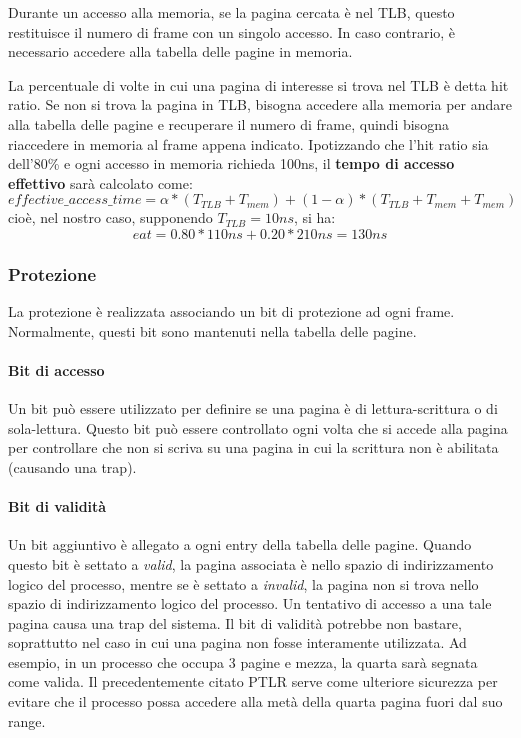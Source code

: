 \documentclass[a4paper]{article}
\begin{document}
Durante un accesso alla memoria, se la pagina cercata è nel TLB, questo restituisce il numero di frame con un singolo accesso. In caso contrario, è necessario accedere alla tabella delle pagine in memoria.

La percentuale di volte in cui una pagina di interesse si trova nel TLB è detta hit ratio. Se non si trova la pagina in TLB, bisogna accedere alla memoria per andare alla tabella delle pagine e recuperare il numero di frame, quindi bisogna riaccedere in memoria al frame appena indicato. Ipotizzando che l'hit ratio sia dell'80\% e ogni accesso in memoria richieda 100ns, il \textbf{tempo di accesso effettivo} sarà calcolato come:
$$ effective\_access\_time = \alpha * (T_{TLB}+T_{mem}) + (1-\alpha) * (T_{TLB}+T_{mem} + T_{mem}) $$
cioè, nel nostro caso, supponendo $T_{TLB} = 10ns$, si ha:
$$ eat = 0.80 * 110ns + 0.20 * 210ns = 130ns $$

\subsubsection{Protezione}
La protezione è realizzata associando un bit di protezione ad ogni frame. Normalmente, questi bit sono mantenuti nella tabella delle pagine.
\paragraph{Bit di accesso} Un bit può essere utilizzato per definire se una pagina è di lettura-scrittura o di sola-lettura. Questo bit può essere controllato ogni volta che si accede alla pagina per controllare che non si scriva su una pagina in cui la scrittura non è abilitata (causando una trap).
\paragraph{Bit di validità} Un bit aggiuntivo è allegato a ogni entry della tabella delle pagine. Quando questo bit è settato a \textit{valid}, la pagina associata è nello spazio di indirizzamento logico del processo, mentre se è settato a \textit{invalid}, la pagina non si trova nello spazio di indirizzamento logico del processo. Un tentativo di accesso a una tale pagina causa una trap del sistema. Il bit di validità potrebbe non bastare, soprattutto nel caso in cui una pagina non fosse interamente utilizzata. Ad esempio, in un processo che occupa 3 pagine e mezza, la quarta sarà segnata come valida. Il precedentemente citato PTLR serve come ulteriore sicurezza per evitare che il processo possa accedere alla metà della quarta pagina fuori dal suo range.
\end{document}
